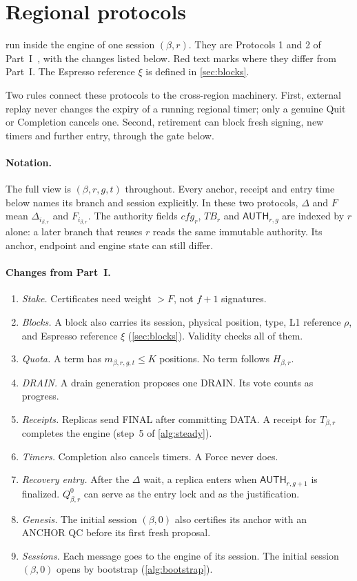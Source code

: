 \documentclass[11pt,a4paper]{article}
\newcommand{\RR}[1]{{\color{rrRed}#1}}
\newcommand{\TB}{\mathit{TB}}
\newcommand{\tagg}[1]{\ensuremath{\mathsf{#1}}}
\newcounter{protocol}
\begin{document}
\section{Regional protocols}
\label{sec:protocols}
 run inside the engine of one session
$(\beta,r)$. They are Protocols 1 and 2 of Part~I~\cite{part1}, with the
changes listed below. \RR{Red text} marks where they differ from Part~I.
The Espresso reference $\xi$ is defined in \cref{sec:blocks}.

Two rules connect these protocols to the cross-region machinery. First,
external replay never changes the expiry of a running regional timer;
only a genuine Quit or Completion cancels one. Second, retirement can
block fresh signing, new timers and further entry, through the gate
below.

\paragraph{Notation.}
The full view is $(\beta,r,g,t)$ throughout. Every anchor, receipt and
entry time below names its branch and session explicitly. In these two
protocols, $\Delta$ and $F$ mean $\Delta_{i_{\beta,r}}$ and
$F_{i_{\beta,r}}$. The authority fields $\mathit{cfg}_r$, $\TB_r$ and
$\tagg{AUTH}_{r,g}$ are indexed by $r$ alone: a later branch that reuses
$r$ reads the same immutable authority. Its anchor, endpoint and engine
state can still differ.

\paragraph{Changes from Part~I.}
\begin{enumerate}[label=\arabic*.]
\item \emph{Stake.} Certificates need weight $>F$, not $f+1$ signatures.
\item \emph{Blocks.} A block also carries its session, physical
position, type, L1 reference $\rho$, and Espresso reference $\xi$
(\cref{sec:blocks}). Validity checks all of them.
\item \emph{Quota.} A term has $m_{\beta,r,g,t}\le K$ positions. No term
follows $H_{\beta,r}$.
\item \emph{DRAIN.} A drain generation proposes one DRAIN. Its vote
counts as progress.
\item \emph{Receipts.} Replicas send FINAL after committing DATA. A
receipt for $T_{\beta,r}$ completes the engine (step~5 of \cref{alg:steady}).
\item \emph{Timers.} Completion also cancels timers. A Force never does.
\item \emph{Recovery entry.} After the $\Delta$ wait, a replica enters
when $\tagg{AUTH}_{r,g+1}$ is finalized. $Q_{\beta,r}^0$ can serve as the
entry lock and as the justification.
\item \emph{Genesis.} The initial session $(\beta,0)$ also certifies its
anchor with an ANCHOR QC before its first fresh proposal.
\item \emph{Sessions.} Each message goes to the engine of its session.
The initial session $(\beta,0)$ opens by bootstrap (\cref{alg:bootstrap}).
\end{enumerate}
\end{document}
